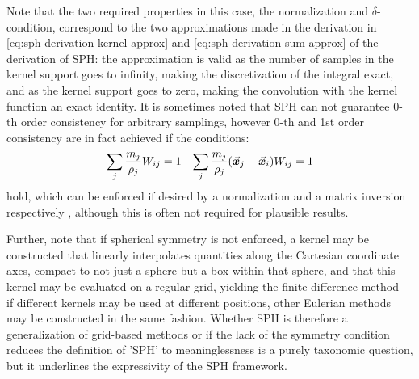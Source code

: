 Note that the two required properties in this case, the normalization and $\delta$-condition, correspond to the two approximations made in the derivation in \autoref{eq:sph-derivation-kernel-approx} and \autoref{eq:sph-derivation-sum-approx} of the derivation of SPH: the approximation is valid as the number of samples in the kernel support goes to infinity, making the discretization of the integral exact, and as the kernel support goes to zero, making the convolution with the kernel function an exact identity\autocite*{sph-lucy-77}. It is sometimes noted that SPH can not guarantee 0-th order consistency for arbitrary samplings, however 0-th and 1st order consistency are in fact achieved if the conditions\autocite{tutorial}:
\begin{align}\label{eq:sph-consistency-conditions}
  \sum_j \frac{m_j}{\rho_j} W_{ij}=1 &  & \sum_j \frac{m_j}{\rho_j} (\vec{\bm{x}}_j-\vec{\bm{x}}_i)W_{ij}=1
\end{align}
hold, which can be enforced if desired by a normalization and a matrix inversion respectively \autocite*{price-2012}, although this is often not required for plausible results.

Further, note that if spherical symmetry is not enforced, a kernel may be constructed that linearly interpolates quantities along the Cartesian coordinate axes, compact to not just a sphere but a box within that sphere, and that this kernel may be evaluated on a regular grid, yielding the finite difference method - if different kernels may be used at different positions, other Eulerian methods may be constructed in the same fashion. Whether SPH is therefore a generalization of grid-based methods or if the lack of the symmetry condition reduces the definition of 'SPH' to meaninglessness is a purely taxonomic question, but it underlines the expressivity of the SPH framework.

\horizontalspacer


